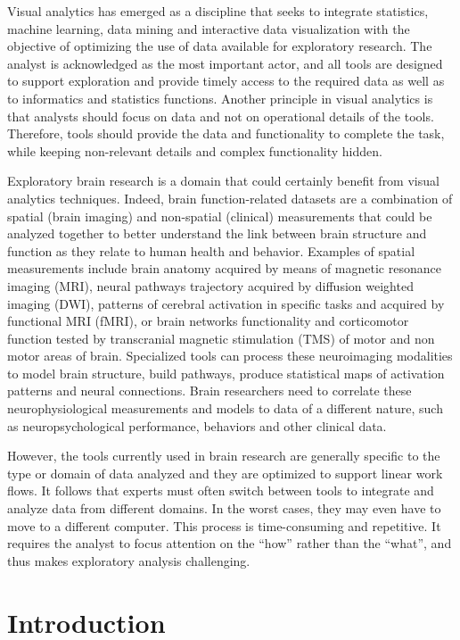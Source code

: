 \documentclass{frontiersHLTH}
\begin{document}
Visual analytics \cite{keim_visual_2008} has emerged as a discipline that seeks to integrate statistics, machine learning, data mining and interactive data visualization with the objective of optimizing the use of data available for exploratory research. The analyst is acknowledged as the most important actor, and all tools are designed to support exploration and provide timely access to the required data as well as to informatics and statistics functions. Another principle in visual analytics is that analysts should focus on data and not on operational details of the tools. Therefore, tools should provide the data and functionality to complete the task, while keeping non-relevant details and complex functionality hidden.

Exploratory brain research is a domain that could certainly benefit from visual analytics techniques. Indeed, brain function-related datasets are a combination of spatial (brain imaging) and non-spatial (clinical) measurements that could be analyzed together to better understand the link between brain structure and function as they relate to human health and behavior. Examples of spatial measurements include brain anatomy acquired by means of magnetic resonance imaging (MRI), neural pathways trajectory acquired by diffusion weighted imaging (DWI), patterns of cerebral activation in specific tasks and acquired by functional MRI (fMRI), or brain networks functionality and corticomotor function tested by transcranial magnetic stimulation (TMS) of motor and non motor areas of brain. Specialized tools can process these neuroimaging modalities to model brain structure, build pathways, produce statistical maps of activation patterns and neural connections. Brain researchers need to correlate these neurophysiological measurements and models to data of a different nature, such as neuropsychological performance, behaviors and other clinical data.


However, the tools currently used in brain research are generally specific to the type or domain of data analyzed and they are optimized to support linear work flows. It follows that experts must often switch between tools to integrate and analyze data from different domains. In the worst cases, they may even have to move to a different computer. This process is time-consuming and repetitive. It requires the analyst to focus attention on the ``how'' rather than the ``what'', and thus makes exploratory analysis challenging.
					
\section{Introduction}
\end{document}

